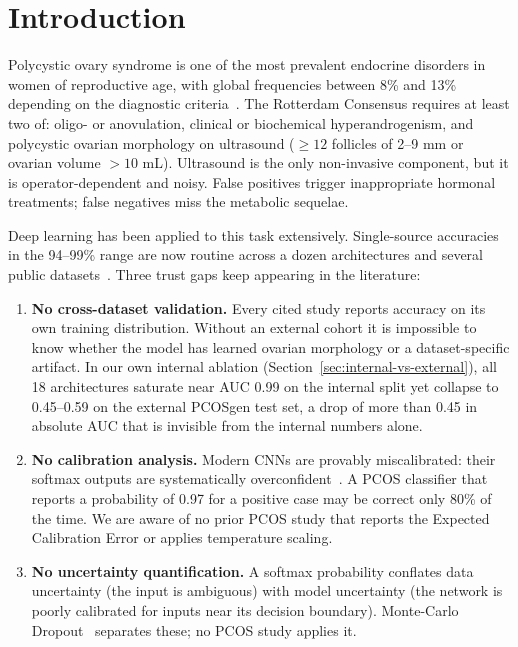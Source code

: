 \documentclass[11pt,twocolumn]{article}
\newcommand{\PCOS}{PCOS}
\newcommand{\AUC}{AUC}
\begin{document}
\section{Introduction}

Polycystic ovary syndrome is one of the most prevalent endocrine disorders
in women of reproductive age, with global frequencies between 8\% and 13\%
depending on the diagnostic criteria~\cite{teede2018, rotterdam2003}. The
Rotterdam Consensus requires at least two of: oligo- or anovulation,
clinical or biochemical hyperandrogenism, and polycystic ovarian
morphology on ultrasound ($\geq 12$ follicles of 2--9 mm or ovarian volume
$>10$ mL). Ultrasound is the only non-invasive component, but it is
operator-dependent and noisy. False positives trigger inappropriate
hormonal treatments; false negatives miss the metabolic sequelae.

Deep learning has been applied to this task extensively. Single-source
accuracies in the 94--99\% range are now routine across a dozen
architectures and several public datasets~\cite{sundari2025, moral2024,
lakshmi2026, reka2025, ghosh2025}. Three trust gaps keep appearing in the
literature:

\begin{enumerate}[leftmargin=*,noitemsep,topsep=2pt]
  \item \textbf{No cross-dataset validation.} Every cited study reports
        accuracy on its own training distribution. Without an external
        cohort it is impossible to know whether the model has learned
        ovarian morphology or a dataset-specific artifact. In our own
        internal ablation (Section~\ref{sec:internal-vs-external}), all 18
        architectures saturate near \AUC{} 0.99 on the internal split yet
        collapse to 0.45--0.59 on the external \PCOS{}gen test set, a drop
        of more than 0.45 in absolute \AUC{} that is invisible from the
        internal numbers alone.
  \item \textbf{No calibration analysis.} Modern CNNs are provably
        miscalibrated: their softmax outputs are systematically
        overconfident~\cite{guo2017}. A \PCOS{} classifier that reports a
        probability of 0.97 for a positive case may be correct only 80\% of
        the time. We are aware of no prior \PCOS{} study that reports the
        Expected Calibration Error or applies temperature scaling.
  \item \textbf{No uncertainty quantification.} A softmax probability
        conflates data uncertainty (the input is ambiguous) with model
        uncertainty (the network is poorly calibrated for inputs near its
        decision boundary). Monte-Carlo Dropout~\cite{gal2016} separates
        these; no \PCOS{} study applies it.
\end{enumerate}
\end{document}
